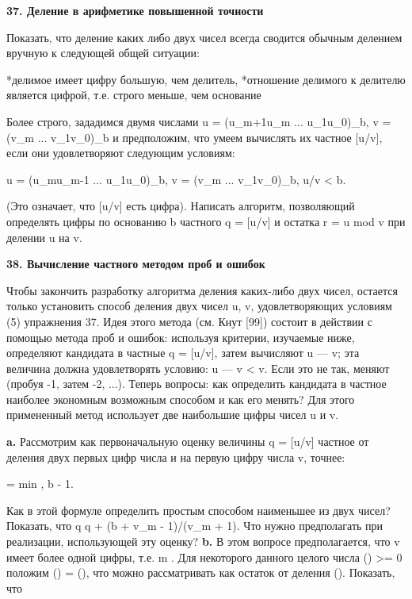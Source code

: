 \textbf{37. Деление в арифметике повышенной точности}

Показать, что деление каких либо двух чисел всегда сводится обычным делением вручную к следующей общей ситуации:

*делимое имеет цифру большую, чем делитель,
*отношение делимого к делителю является цифрой, т.е. строго меньше, чем основание

Более строго, зададимся двумя числами u = (u_{m+1}u_{m} ... u_{1}u_{0})_{b}, v = (v_{m} ... v_{1}v_{0})_{b} и предположим, что умеем вычислять их частное [u/v], если они удовлетворяют следующим условиям:

u = (u_{m}u_{m-1} ... u_{1}u_{0})_{b}, v = (v_{m} ... v_{1}v_{0})_{b}, u/v < b.

(Это означает, что [u/v] есть цифра). Написать алгоритм, позволяющий определять цифры по основанию b частного q = [u/v] и остатка r = u mod v при делении u на v.

\textbf{38. Вычисление частного методом проб и ошибок}

Чтобы закончить разработку алгоритма деления каких-либо двух чисел, остается только установить способ деления двух чисел u, v, удовлетворяющих условиям (5) упражнения 37.
Идея этого метода (см. Кнут [99]) состоит в действии с помощью метода проб и ошибок: используя критерии, изучаемые ниже, определяют кандидата в частные  \geqslant q = [u/v], затем вычисляют u — v; эта величина должна удовлетворять условию: u — v < v. Если это не так, меняют  (пробуя -1, затем -2, ...). Теперь вопросы: как определить кандидата в частное наиболее экономным возможным способом и как его менять? Для этого примененный метод использует две наибольшие цифры чисел u и v.

\textbf{a.} Рассмотрим как первоначальную оценку величины q = [u/v] частное от деления двух первых цифр числа и на первую цифру числа v, точнее:

 = min \lgroup \lfloor {} \rfloor , b - 1\rgroup .

Как в этой формуле определить простым способом наименьшее из двух чисел? Показать, что q \leqslant {} \leqslant q + (b + v_{m} - 1)/(v_{m} + 1). Что нужно предполагать при реализации, использующей эту оценку?
\textbf{b.} В этом вопросе предполагается, что v имеет более одной цифры, т.е. m . Для некоторого данного целого числа () >= 0 положим () = (), что можно рассматривать как остаток от деления (). Показать, что

